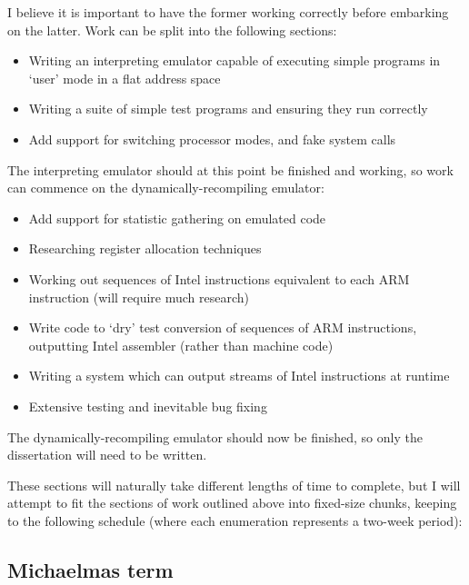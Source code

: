 I believe it is important to have the former working correctly before embarking on the latter. Work can be split into the following sections:

\begin{itemize}

\item Writing an interpreting emulator capable of executing simple programs in `user' mode in a flat address space
\item Writing a suite of simple test programs and ensuring they run correctly
\item Add support for switching processor modes, and fake system calls

\end{itemize}
	
The interpreting emulator should at this point be finished and
working, so work can commence on the dynamically-recompiling emulator:

\begin{itemize}

\item Add support for statistic gathering on emulated code
\item Researching register allocation techniques
\item Working out sequences of Intel instructions equivalent to each ARM instruction (will require much research)
\item Write code to `dry' test conversion of sequences of ARM instructions, outputting Intel assembler (rather than machine code)
\item Writing a system which can output streams of Intel instructions at runtime
\item Extensive testing and inevitable bug fixing

\end{itemize}

The dynamically-recompiling emulator should now be finished, so only
the dissertation will need to be written.

These sections will naturally take different lengths of time to
complete, but I will attempt to fit the sections of work outlined above into fixed-size
chunks, keeping to the following schedule (where each enumeration represents a two-week period):

\subsection*{Michaelmas term}

